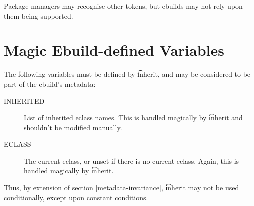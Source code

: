 Package managers may recognise other tokens, but ebuilds may not rely upon them being supported.


\section{Magic Ebuild-defined Variables}

The following variables must be defined by \t{inherit}, and may be considered to be part
of the ebuild's metadata:

\begin{description}
\item[INHERITED] List of inherited eclass names. This is handled magically by \t{inherit} and
    shouldn't be modified manually.
\item[ECLASS] The current eclass, or unset if there is no current eclass. Again, this is handled
    magically by \t{inherit}.
\end{description}

\note Thus, by extension of section \ref{metadata-invariance}, \t{inherit} may not be used
    conditionally, except upon constant conditions.

